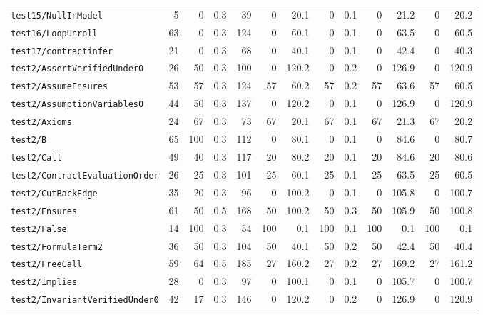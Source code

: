 \documentclass[a4paper,final]{llncs}
\begin{document}
\begin{scriptsize}
\begin{longtable}{l |r *{1}{rr} |r *{4}{rr}}
\verb|test15/NullInModel|  &  5  &  0  &  0.3  &  39  &  0  &  20.1  &  0  &  0.1  &  0  &  21.2  &  0  &  20.2  \\
\verb|test16/LoopUnroll|  &  63  &  0  &  0.3  &  124  &  0  &  60.1  &  0  &  0.1  &  0  &  63.5  &  0  &  60.5  \\
\verb|test17/contractinfer|  &  21  &  0  &  0.3  &  68  &  0  &  40.1  &  0  &  0.1  &  0  &  42.4  &  0  &  40.3  \\
\verb|test2/AssertVerifiedUnder0|  &  26  &  50  &  0.3  &  100  &  0  &  120.2  &  0  &  0.2  &  0  &  126.9  &  0  &  120.9  \\
\verb|test2/AssumeEnsures|  &  53  &  57  &  0.3  &  124  &  57  &  60.2  &  57  &  0.2  &  57  &  63.6  &  57  &  60.5  \\
\verb|test2/AssumptionVariables0|  &  44  &  50  &  0.3  &  137  &  0  &  120.2  &  0  &  0.1  &  0  &  126.9  &  0  &  120.9  \\
\verb|test2/Axioms|  &  24  &  67  &  0.3  &  73  &  67  &  20.1  &  67  &  0.1  &  67  &  21.3  &  67  &  20.2  \\
\verb|test2/B|  &  65  &  100  &  0.3  &  112  &  0  &  80.1  &  0  &  0.1  &  0  &  84.6  &  0  &  80.7  \\
\verb|test2/Call|  &  49  &  40  &  0.3  &  117  &  20  &  80.2  &  20  &  0.1  &  20  &  84.6  &  20  &  80.6  \\
\verb|test2/ContractEvaluationOrder|  &  26  &  25  &  0.3  &  101  &  25  &  60.1  &  25  &  0.1  &  25  &  63.5  &  25  &  60.5  \\
\verb|test2/CutBackEdge|  &  35  &  20  &  0.3  &  96  &  0  &  100.2  &  0  &  0.1  &  0  &  105.8  &  0  &  100.7  \\
\verb|test2/Ensures|  &  61  &  50  &  0.5  &  168  &  50  &  100.2  &  50  &  0.3  &  50  &  105.9  &  50  &  100.8  \\
\verb|test2/False|  &  14  &  100  &  0.3  &  54  &  100  &  0.1  &  100  &  0.1  &  100  &  0.1  &  100  &  0.1  \\
\verb|test2/FormulaTerm2|  &  36  &  50  &  0.3  &  104  &  50  &  40.1  &  50  &  0.2  &  50  &  42.4  &  50  &  40.4  \\
\verb|test2/FreeCall|  &  59  &  64  &  0.5  &  185  &  27  &  160.2  &  27  &  0.2  &  27  &  169.2  &  27  &  161.2  \\
\verb|test2/Implies|  &  28  &  0  &  0.3  &  97  &  0  &  100.1  &  0  &  0.1  &  0  &  105.7  &  0  &  100.7  \\
\verb|test2/InvariantVerifiedUnder0|  &  42  &  17  &  0.3  &  146  &  0  &  120.2  &  0  &  0.2  &  0  &  126.9  &  0  &  120.9  \\

\end{longtable}
\end{scriptsize}
\end{document}
